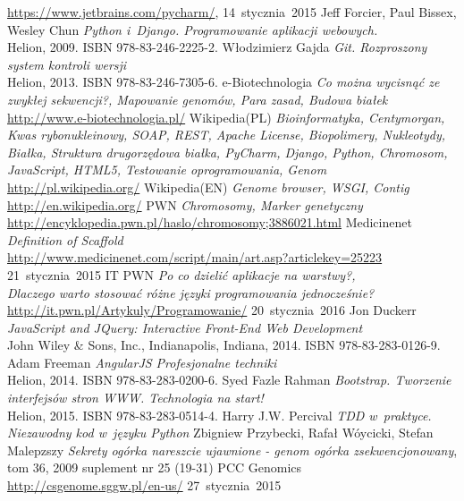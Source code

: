 \documentclass[a4paper,12pt,oneside]{mwrep}  %
\begin{document}
\begin{thebibliography}{99}
\url{https://www.jetbrains.com/pycharm/}, \mbox{14~stycznia~2015}
 Jeff Forcier, Paul Bissex, Wesley Chun \emph{Python i~Django. Programowanie aplikacji webowych.}\\
Helion, 2009. ISBN 978-83-246-2225-2.
Włodzimierz Gajda \emph{Git. Rozproszony system kontroli wersji}\\
Helion, 2013. ISBN 978-83-246-7305-6.
 e-Biotechnologia \emph{Co można wycisnąć ze zwykłej sekwencji?, Mapowanie genomów, Para zasad, Budowa białek}\\ \url{http://www.e-biotechnologia.pl/}
 Wikipedia(PL) \emph{Bioinformatyka, Centymorgan, Kwas rybonukleinowy, SOAP, REST, Apache License, Biopolimery, Nukleotydy, Białka, Struktura drugorzędowa białka, PyCharm, Django, Python, Chromosom, JavaScript, HTML5, Testowanie oprogramowania, Genom} \\ \url{http://pl.wikipedia.org/}
 Wikipedia(EN) \emph{Genome browser, WSGI, Contig} \\ \url{http://en.wikipedia.org/}
 PWN \emph{Chromosomy, Marker genetyczny} \\ \url{http://encyklopedia.pwn.pl/haslo/chromosomy;3886021.html}
 Medicinenet \emph{Definition of Scaffold} \\ \url{http://www.medicinenet.com/script/main/art.asp?articlekey=25223} \mbox{21~stycznia~2015}
 IT PWN \emph{Po co dzielić aplikacje na warstwy?,\\ Dlaczego warto stosować różne języki programowania jednocześnie?}\\ \url{http://it.pwn.pl/Artykuly/Programowanie/} \mbox{20~stycznia~2016}
Jon Duckerr \emph{JavaScript and JQuery: Interactive Front-End Web Development}\\ John Wiley \& Sons, Inc., Indianapolis, Indiana, 2014. ISBN 978-83-283-0126-9.
Adam Freeman \emph{AngularJS Profesjonalne techniki}\\ Helion, 2014. ISBN 978-83-283-0200-6.
Syed Fazle Rahman \emph{Bootstrap. Tworzenie interfejsów stron WWW. Technologia na start!}\\ Helion, 2015. ISBN 978-83-283-0514-4.
Harry J.W. Percival \emph{TDD w~praktyce. Niezawodny kod w~języku Python}
 Zbigniew Przybecki, Rafał Wóycicki, Stefan Malepzszy \emph{Sekrety ogórka nareszcie ujawnione - genom ogórka zsekwencjonowany}, tom 36, 2009 suplement nr 25 (19-31)
 PCC Genomics \\ \url{http://csgenome.sggw.pl/en-us/} \mbox{27~stycznia~2015}
\end{thebibliography}
\end{document}
